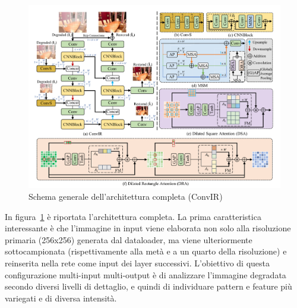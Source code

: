 \documentclass[a4paper,10pt,twocolumn]{article}
\begin{document}
\begin{figure}[t]
\centering
\includegraphics[width=\linewidth]{figures/architecture_complete.png}
\caption{Schema generale dell'architettura completa (ConvIR)}
\label{fig:architecture}
\end{figure}

In figura~\ref{fig:architecture} è riportata l'architettura completa. La prima caratteristica interessante è che l'immagine in input viene elaborata non solo alla risoluzione primaria (256x256) generata dal dataloader,
ma viene ulteriormente sottocampionata (rispettivamente alla metà e a un quarto della risoluzione) e reinserita nella rete come input dei layer successivi.
L'obiettivo di questa configurazione multi-input multi-output è di analizzare l'immagine degradata secondo diversi livelli di dettaglio, e quindi di individuare pattern e feature più variegati e di diversa intensità.
\end{document}
